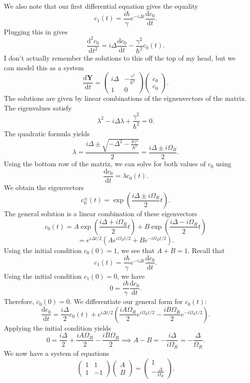 \documentclass[11pt, letterpaper]{article}
\begin{document}
We also note that our first differential equation gives the equality
\[
	c_1(t)=\frac{i\hbar}{\gamma } e^{-i\Delta t} \frac{\mathrm{d}c_0}{\mathrm{d}t} 
.\]
Plugging this in gives
\[
	\frac{\mathrm{d}^2c_0}{\mathrm{d}t^2} =i \Delta \frac{\mathrm{d}c_0}{\mathrm{d}t} -\frac{\gamma ^2}{\hbar^2} c_0(t)
.\]
I don't actually remember the solutions to this off the top of my head, but we can model this as a system
\[
	\frac{\mathrm{d}\mathbf{Y} }{\mathrm{d}t} =\begin{pmatrix}
	i\Delta  & -\frac{\gamma ^2}{\hbar^2}  \\
	1 & 0
	\end{pmatrix}\begin{pmatrix}
	\dot{c} _0 \\
	c_0
	\end{pmatrix}
.\]
The solutions are given by linear combinations of the eignenvectors of the matrix. The eigenvalues satisfy
\[
	\lambda ^2-i\Delta \lambda +\frac{\gamma ^2}{\hbar^2} =0
.\]
The quadratic formula yields
\[
	\lambda =\frac{i\Delta \pm\sqrt{-\Delta ^2-\frac{4\gamma ^2}{\hbar^2} } }{2} =\frac{i\Delta \pm i\Omega _R}{2} 
.\]
Using the bottom row of the matrix, we can solve for both values of $c_0$ using
\[
	\frac{\mathrm{d}c_0}{\mathrm{d}t} =\lambda c_0(t)
.\]
We obtain the eigenvectors
\[
	c_0^\pm(t)=\exp \left( \frac{i\Delta \pm i\Omega _R}{2} t \right) 
.\]
The general solution is a linear combination of these eigenvectors
\[
	c_0(t)=A \exp \left( \frac{i\Delta + i\Omega _R}{2} t \right) +B \exp \left( \frac{i\Delta-i\Omega _R }{2} t \right) 
\]
\[
	=e^{i\Delta t/2} \left( A e^{i\Omega _Rt/2} +Be^{-i\Omega _Rt/2}  \right) 
.\]
Using the initial condition $c_0(0)=1$, we see that $A+B=1$. Recall that
\[
	c_1(t)=\frac{i\hbar}{\gamma } e^{-i\Delta t} \frac{\mathrm{d}c_0}{\mathrm{d}t} 
.\]
Using the initial condition $c_1(0)=0$, we have
\[
	0=\frac{i\hbar}{\gamma } \frac{\mathrm{d}c_0}{\mathrm{d}t} 
.\]
Therefore, $\dot{c} _0(0)=0$. We differentiate our general form for $c_0(t)$:
\[
	\frac{\mathrm{d}c_0}{\mathrm{d}t} =\frac{i\Delta }{2} c_0(t)+e^{i\Delta t/2} \left( \frac{iA\Omega _R}{2} e^{i\Omega _Rt/2} -\frac{iB\Omega _R}{2} e^{-i\Omega _Rt/2}  \right) 
.\]
Applying the initial condition yields
\[
	0=\frac{i\Delta }{2} +\frac{iA\Omega _R}{2} -\frac{iB\Omega _R}{2} \implies A-B=-\frac{i\Delta }{i\Omega _R} =-\frac{\Delta }{\Omega _R} 
.\]
We now have a system of equations
\[
	\begin{pmatrix}
	1 & 1 \\
	1 & -1
	\end{pmatrix}\begin{pmatrix}
	A \\
	B
	\end{pmatrix}=\begin{pmatrix}
	1 \\
	-\frac{\Delta }{\Omega _R} 
	\end{pmatrix}
.\]
\end{document}
